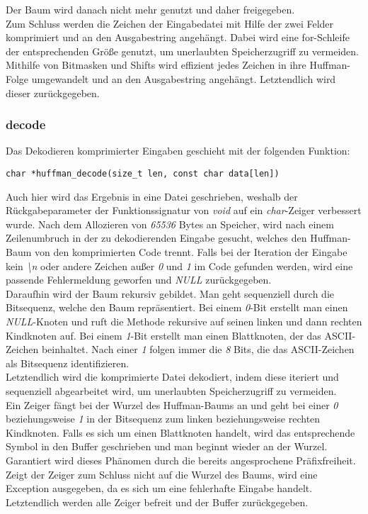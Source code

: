 \documentclass[course=erap]{aspdoc}
\begin{document}
Der Baum wird danach nicht mehr genutzt und daher freigegeben.\\
Zum Schluss werden die Zeichen der Eingabedatei mit Hilfe der zwei Felder komprimiert und an den Ausgabestring angehängt. Dabei wird eine for-Schleife der entsprechenden Größe genutzt, um unerlaubten Speicherzugriff zu vermeiden. Mithilfe von Bitmasken und Shifts wird effizient jedes Zeichen in ihre Huffman-Folge umgewandelt und an den Ausgabestring angehängt. Letztendlich wird dieser zurückgegeben.

\subsubsection{decode}
Das Dekodieren komprimierter Eingaben geschieht mit der folgenden Funktion:
\begin{center}
    \begin{lstlisting}[frame=single, framerule=0pt, numbers=none]
        char *huffman_decode(size_t len, const char data[len])
    \end{lstlisting}
\end{center}
Auch hier wird das Ergebnis in eine Datei geschrieben, weshalb der Rückgabeparameter der Funktionssignatur von \textit{void} auf ein \textit{char}-Zeiger verbessert wurde. Nach dem Allozieren von \textit{65536} Bytes an Speicher, wird nach einem Zeilenumbruch in der zu dekodierenden Eingabe gesucht, welches den Huffman-Baum von den komprimierten Code trennt. Falls bei der Iteration der Eingabe kein \textit{\textbackslash n} oder andere Zeichen außer \textit{0} und \textit{1} im Code gefunden werden, wird eine passende Fehlermeldung geworfen und \textit{NULL} zurückgegeben.\\
Daraufhin wird der Baum rekursiv gebildet. Man geht sequenziell durch die Bitsequenz, welche den Baum repräsentiert. Bei einem \textit{0}-Bit erstellt man einen \textit{NULL}-Knoten und ruft die Methode rekursive auf seinen linken und dann rechten Kindknoten auf. Bei einem \textit{1}-Bit erstellt man einen Blattknoten, der das ASCII-Zeichen beinhaltet. Nach einer \textit{1} folgen immer die \textit{8} Bits, die das ASCII-Zeichen als Bitsequenz identifizieren.\\
Letztendlich wird die komprimierte Datei dekodiert, indem diese iteriert und sequenziell abgearbeitet wird, um unerlaubten Speicherzugriff zu vermeiden.\\
Ein Zeiger fängt bei der Wurzel des Huffman-Baums an und geht bei einer \textit{0} beziehungsweise \textit{1} in der Bitsequenz zum linken beziehungsweise rechten Kindknoten. Falls es sich um einen Blattknoten handelt, wird das entsprechende Symbol in den Buffer geschrieben und man beginnt wieder an der Wurzel. Garantiert wird dieses Phänomen durch die bereits angesprochene Präfixfreiheit.\\
Zeigt der Zeiger zum Schluss nicht auf die Wurzel des Baums, wird eine Exception ausgegeben, da es sich um eine fehlerhafte Eingabe handelt.
Letztendlich werden alle Zeiger befreit und der Buffer zurückgegeben.
\end{document}
